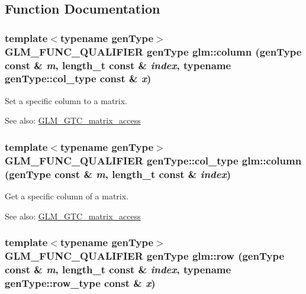 \subsection{Function Documentation}
\hypertarget{group__gtc__matrix__access_gea14296c0a9299135e7c7c03826c2604}{
\subsubsection[column]{\setlength{\rightskip}{0pt plus 5cm}template$<$typename genType$>$ GLM\_\-FUNC\_\-QUALIFIER genType glm::column (genType const \& {\em m}, \/  length\_\-t const \& {\em index}, \/  typename genType::col\_\-type const \& {\em x})}}
\label{group__gtc__matrix__access_gea14296c0a9299135e7c7c03826c2604}


Set a specific column to a matrix. \begin{Desc}
\item[See also:]\hyperlink{group__gtc__matrix__access}{GLM\_\-GTC\_\-matrix\_\-access} \end{Desc}
\hypertarget{group__gtc__matrix__access_g8cd6c920268e4e2eb90ed2b30665d9e5}{
\subsubsection[column]{\setlength{\rightskip}{0pt plus 5cm}template$<$typename genType$>$ GLM\_\-FUNC\_\-QUALIFIER genType::col\_\-type glm::column (genType const \& {\em m}, \/  length\_\-t const \& {\em index})}}
\label{group__gtc__matrix__access_g8cd6c920268e4e2eb90ed2b30665d9e5}


Get a specific column of a matrix. \begin{Desc}
\item[See also:]\hyperlink{group__gtc__matrix__access}{GLM\_\-GTC\_\-matrix\_\-access} \end{Desc}
\hypertarget{group__gtc__matrix__access_g4409b9c0604f3ed3e6f116b6680eae44}{
\subsubsection[row]{\setlength{\rightskip}{0pt plus 5cm}template$<$typename genType$>$ GLM\_\-FUNC\_\-QUALIFIER genType glm::row (genType const \& {\em m}, \/  length\_\-t const \& {\em index}, \/  typename genType::row\_\-type const \& {\em x})}}
\label{group__gtc__matrix__access_g4409b9c0604f3ed3e6f116b6680eae44}


